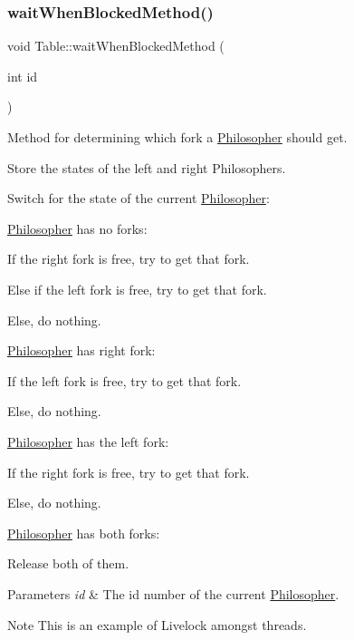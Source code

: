 \subsubsection{\texorpdfstring{wait\+When\+Blocked\+Method()}{waitWhenBlockedMethod()}}
{\footnotesize\ttfamily void Table\+::wait\+When\+Blocked\+Method (\begin{DoxyParamCaption}\item[{int}]{id }\end{DoxyParamCaption})}



Method for determining which fork a \hyperlink{class_philosopher}{Philosopher} should get. 


\begin{DoxyItemize}
\item Store the states of the left and right Philosophers.
\item Switch for the state of the current \hyperlink{class_philosopher}{Philosopher}\+:
\begin{DoxyItemize}
\item \hyperlink{class_philosopher}{Philosopher} has no forks\+:
\begin{DoxyItemize}
\item If the right fork is free, try to get that fork.
\item Else if the left fork is free, try to get that fork.
\item Else, do nothing.
\end{DoxyItemize}
\item \hyperlink{class_philosopher}{Philosopher} has right fork\+:
\begin{DoxyItemize}
\item If the left fork is free, try to get that fork.
\item Else, do nothing.
\end{DoxyItemize}
\item \hyperlink{class_philosopher}{Philosopher} has the left fork\+:
\begin{DoxyItemize}
\item If the right fork is free, try to get that fork.
\item Else, do nothing.
\end{DoxyItemize}
\item \hyperlink{class_philosopher}{Philosopher} has both forks\+:
\begin{DoxyItemize}
\item Release both of them.
\end{DoxyItemize}
\end{DoxyItemize}
\end{DoxyItemize}
\begin{DoxyParams}{Parameters}
{\em id} & The id number of the current \hyperlink{class_philosopher}{Philosopher}. \\
\hline
\end{DoxyParams}
\begin{DoxyNote}{Note}
This is an example of Livelock amongst threads. 
\end{DoxyNote}


